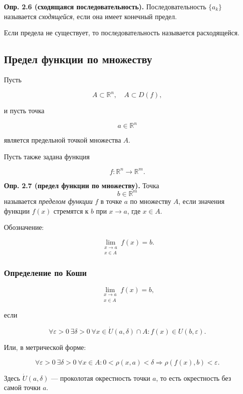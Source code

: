\documentclass[a4paper,12pt]{article}
\begin{document}
\begin{definitionbox}
\textbf{Опр. 2.6 (сходящаяся последовательность).}
Последовательность $\{a_k\}$ называется \textit{сходящейся}, если она имеет конечный предел.
\end{definitionbox}

Если предела не существует, то последовательность называется расходящейся.

\subsection*{Предел функции по множеству}

Пусть

\[
A\subset \mathbb{R}^n, \quad A\subset D(f),
\]

и пусть точка

\[
a\in\mathbb{R}^n
\]

является предельной точкой множества $A$.

Пусть также задана функция

\[
f:\mathbb{R}^n\to\mathbb{R}^m.
\]

\begin{definitionbox}
\textbf{Опр. 2.7 (предел функции по множеству).}
Точка
\[
b\in\mathbb{R}^m
\]
называется \textit{пределом функции} $f$ в точке $a$ по множеству $A$, если значения функции $f(x)$ стремятся к $b$ при $x\to a$, где $x\in A$.
\end{definitionbox}

Обозначение:

\[
\lim_{\substack{x\to a\\ x\in A}} f(x)=b.
\]

\subsubsection*{Определение по Коши}

\[
\lim_{\substack{x\to a\\ x\in A}} f(x)=b,
\]

если

\[
\forall \varepsilon>0\ \exists \delta>0\ \forall x\in \dot U(a,\delta)\cap A:
f(x)\in U(b,\varepsilon).
\]

Или, в метрической форме:

\[
\forall \varepsilon>0\ \exists \delta>0\ \forall x\in A:
0<\rho(x,a)<\delta \Rightarrow \rho(f(x),b)<\varepsilon.
\]

Здесь $\dot U(a,\delta)$ — проколотая окрестность точки $a$, то есть окрестность без самой точки $a$.
\end{document}
